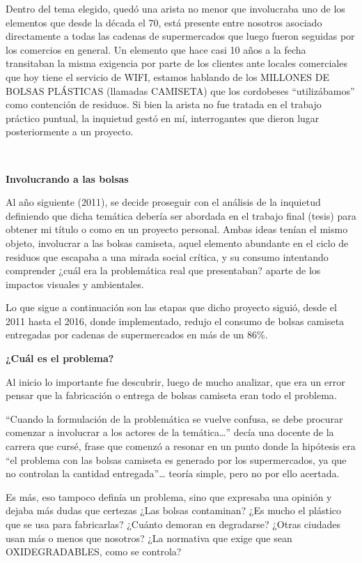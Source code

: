 \begin{fullwidth}
Dentro del tema elegido, quedó una arista no menor que involucraba uno
de los elementos que desde la década el 70, está presente entre nosotros
asociado directamente a todas las cadenas de supermercados que luego
fueron seguidas por los comercios en general. Un elemento que hace casi
10 años a la fecha transitaban la misma exigencia por parte de los
clientes ante locales comerciales que hoy tiene el servicio de WIFI,
estamos hablando de los MILLONES DE BOLSAS PLÁSTICAS (llamadas CAMISETA)
que los cordobeses ``utilizábamos'' como contención de residuos. Si bien
la arista no fue tratada en el trabajo práctico puntual, la inquietud
gestó en mí, interrogantes que dieron lugar posteriormente a un
proyecto.

~

\textbf{Involucrando a las bolsas}

Al año siguiente (2011), se decide proseguir con el análisis de la
inquietud definiendo que dicha temática debería ser abordada en el
trabajo final (tesis) para obtener mi título o como en un proyecto
personal. Ambas ideas tenían el mismo objeto, involucrar a las bolsas
camiseta, aquel elemento abundante en el ciclo de residuos que escapaba
a una mirada social crítica, y su consumo intentando comprender ¿cuál
era la problemática real que presentaban? aparte de los impactos
visuales y ambientales.

Lo que sigue a continuación son las etapas que dicho proyecto siguió,
desde el 2011 hasta el 2016, donde implementado, redujo el consumo de
bolsas camiseta entregadas por cadenas de supermercados en más de un
86\%.

\textbf{¿Cuál es el problema?}

Al inicio lo importante fue descubrir, luego de mucho analizar, que era
un error pensar que la fabricación o entrega de bolsas camiseta eran
todo el problema\emph{.}

``Cuando la formulación de la problemática se vuelve confusa, se debe
procurar comenzar a involucrar a los actores de la temática\ldots{}''
decía una docente de la carrera que cursé, frase que comenzó a resonar
en un punto donde la hipótesis era ``el problema con las bolsas camiseta
es generado por los supermercados, ya que no controlan la cantidad
entregada''\ldots{} teoría simple, pero no por ello acertada.

Es más, eso tampoco definía un problema, sino que expresaba una opinión
y dejaba más dudas que certezas ¿Las bolsas contaminan? ¿Es mucho el
plástico que se usa para fabricarlas? ¿Cuánto demoran en degradarse?
¿Otras ciudades usan más o menos que nosotros? ¿La normativa que exige
que sean OXIDEGRADABLES, como se controla?


\end{fullwidth}
